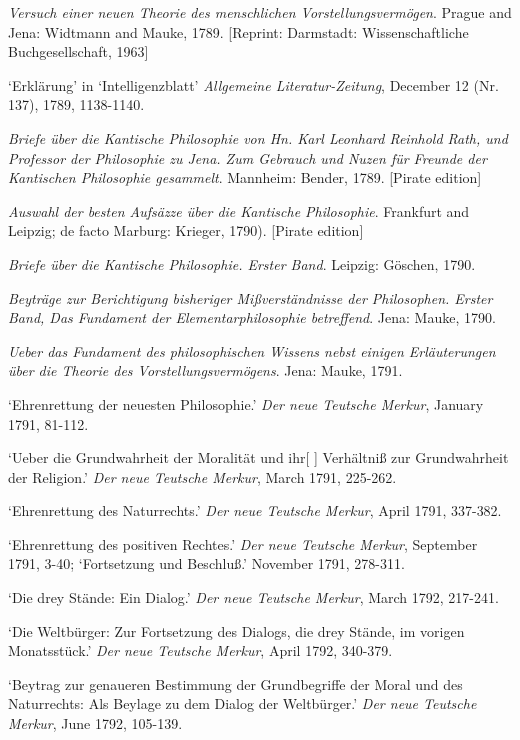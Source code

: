 \textit{Versuch einer neuen Theorie des menschlichen Vorstellungsverm\"{o}gen}. Prague and Jena: Widtmann and Mauke, 1789. [Reprint: Darmstadt: Wissenschaftliche Buchgesellschaft, 1963]

`Erkl\"{a}rung' in `Intelligenzblatt' \textit{Allgemeine Literatur{-}Zeitung}, December 12 (Nr. 137), 1789, 1138{-}1140.

\textit{Briefe \"{u}ber die Kantische Philosophie von Hn. Karl Leonhard Reinhold Rath, und Professor der Philosophie zu Jena. Zum Gebrauch und Nuzen f\"{u}r Freunde der Kantischen Philosophie gesammelt}. Mannheim: Bender, 1789. [Pirate edition]

\textit{Auswahl der besten Aufs\"{a}zze \"{u}ber die Kantische Philosophie}. Frankfurt and Leipzig; de facto Marburg: Krieger, 1790). [Pirate edition]

\textit{Briefe \"{u}ber die Kantische Philosophie. Erster Band}. Leipzig: G\"{o}schen, 1790. 

\textit{Beytr\"{a}ge zur Berichtigung bisheriger Mi\ss{}verst\"{a}ndnisse der Philosophen. Erster Band, Das Fundament der Elementarphilosophie betreffend}. Jena: Mauke, 1790.

\textit{Ueber das Fundament des philosophischen Wissens nebst einigen Erl\"{a}uterungen \"{u}ber die Theorie des Vorstellungsverm\"{o}gens}. Jena: Mauke, 1791.

`Ehrenrettung der neuesten Philosophie.' \textit{Der neue Teutsche Merkur}, January 1791, 81{-}112.

`Ueber die Grundwahrheit der Moralit\"{a}t und ihr[ ] Verh\"{a}ltni\ss{} zur Grundwahrheit der Religion.'\textit{ Der neue Teutsche Merkur}, March 1791, 225{-}262.

`Ehrenrettung des Naturrechts.' \textit{Der neue Teutsche Merkur}, April 1791, 337{-}382.

`Ehrenrettung des positiven Rechtes.' \textit{Der neue Teutsche Merkur}, September 1791, 3{-}40; `Fortsetzung und Beschlu\ss{}.' November 1791, 278{-}311. 

`Die drey St\"{a}nde: Ein Dialog.' \textit{Der neue Teutsche Merkur}, March 1792, 217{-}241.

`Die Weltb\"{u}rger: Zur Fortsetzung des Dialogs, die drey St\"{a}nde, im vorigen Monatsst\"{u}ck.' \textit{Der neue Teutsche Merkur}, April 1792, 340{-}379.

`Beytrag zur genaueren Bestimmung der Grundbegriffe der Moral und des Naturrechts: Als Beylage zu dem Dialog der Weltb\"{u}rger.' \textit{Der neue Teutsche Merkur}, June 1792, 105{-}139.


